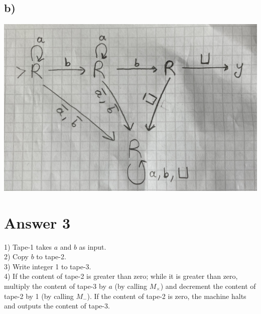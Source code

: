 \documentclass{article}
\begin{document}
\subsection*{b)}
\includegraphics[width=1\textwidth]{IMG-0788.jpg} 

\section*{Answer 3}
1) Tape-1 takes $a$ and $b$ as input.\\
2) Copy $b$ to tape-2.\\
3) Write integer 1 to tape-3.\\
4) If the content of tape-2 is greater than zero; while it is greater than zero, multiply the content of tape-3 by $a$ (by calling $M_\times$) and decrement the content of tape-2 by 1 (by calling $M_-$). If the content of tape-2 is zero, the machine halts and outputs the content of tape-3.
\end{document}

